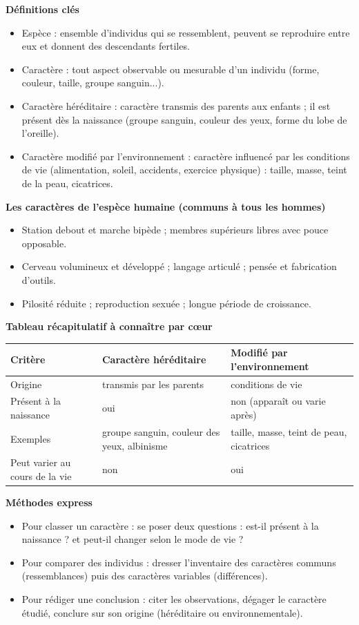 \documentclass[11pt]{article}
\newcommand{\cle}[1]{{\popxbold\color{popdark}#1}}
\begin{document}
\begin{bilan}
\textbf{Définitions clés}
\begin{itemize}
  \item \cle{Espèce} : ensemble d'individus qui se ressemblent, peuvent se reproduire entre eux et donnent des descendants fertiles.
  \item \cle{Caractère} : tout aspect observable ou mesurable d'un individu (forme, couleur, taille, groupe sanguin...).
  \item \cle{Caractère héréditaire} : caractère transmis des parents aux enfants ; il est présent dès la naissance (groupe sanguin, couleur des yeux, forme du lobe de l'oreille).
  \item \cle{Caractère modifié par l'environnement} : caractère influencé par les conditions de vie (alimentation, soleil, accidents, exercice physique) : taille, masse, teint de la peau, cicatrices.
\end{itemize}

\textbf{Les caractères de l'espèce humaine (communs à tous les hommes)}
\begin{itemize}
  \item Station debout et marche bipède ; membres supérieurs libres avec pouce opposable.
  \item Cerveau volumineux et développé ; langage articulé ; pensée et fabrication d'outils.
  \item Pilosité réduite ; reproduction sexuée ; longue période de croissance.
\end{itemize}

\textbf{Tableau récapitulatif à connaître par c\oe ur}
\begin{center}
\begin{tabularx}{\linewidth}{|l|X|X|}
\hline
\rowcolor{popblueL} \textbf{Critère} & \textbf{Caractère héréditaire} & \textbf{Modifié par l'environnement} \\
\hline
Origine & transmis par les parents & conditions de vie \\
\hline
Présent à la naissance & oui & non (apparaît ou varie après) \\
\hline
Exemples & groupe sanguin, couleur des yeux, albinisme & taille, masse, teint de peau, cicatrices \\
\hline
Peut varier au cours de la vie & non & oui \\
\hline
\end{tabularx}
\end{center}

\textbf{Méthodes express}
\begin{itemize}
  \item Pour classer un caractère : se poser deux questions : \og est-il présent à la naissance ? \fg{} et \og peut-il changer selon le mode de vie ? \fg{}
  \item Pour comparer des individus : dresser l'inventaire des caractères communs (ressemblances) puis des caractères variables (différences).
  \item Pour rédiger une conclusion : citer les observations, dégager le caractère étudié, conclure sur son origine (héréditaire ou environnementale).
\end{itemize}
\end{bilan}
\end{document}

